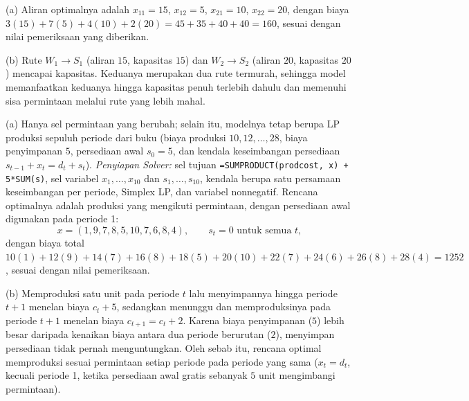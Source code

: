 (a) Aliran optimalnya adalah $x_{11} = 15$, $x_{12} = 5$, $x_{21} = 10$, $x_{22} = 20$, dengan biaya $3(15) + 7(5) + 4(10) + 2(20) = 45 + 35 + 40 + 40 = 160$, sesuai dengan nilai pemeriksaan yang diberikan.

(b) Rute $W_1 \to S_1$ (aliran $15$, kapasitas $15$) dan $W_2 \to S_2$ (aliran $20$, kapasitas $20$) mencapai kapasitas. Keduanya merupakan dua rute termurah, sehingga model memanfaatkan keduanya hingga kapasitas penuh terlebih dahulu dan memenuhi sisa permintaan melalui rute yang lebih mahal.


(a) Hanya sel permintaan yang berubah; selain itu, modelnya tetap berupa LP produksi sepuluh periode dari buku (biaya produksi $10, 12, \dots, 28$, biaya penyimpanan $5$, persediaan awal $s_0 = 5$, dan kendala keseimbangan persediaan $s_{t-1} + x_t = d_t + s_t$). \emph{Penyiapan Solver:} sel tujuan \texttt{=SUMPRODUCT(prodcost, x) + 5*SUM(s)}, sel variabel $x_1,\dots,x_{10}$ dan $s_1,\dots,s_{10}$, kendala berupa satu persamaan keseimbangan per periode, Simplex LP, dan variabel nonnegatif. Rencana optimalnya adalah produksi yang mengikuti permintaan, dengan persediaan awal digunakan pada periode 1:
\[
x = (1, 9, 7, 8, 5, 10, 7, 6, 8, 4), \qquad s_t = 0 \text{ untuk semua } t,
\]
dengan biaya total $10(1) + 12(9) + 14(7) + 16(8) + 18(5) + 20(10) + 22(7) + 24(6) + 26(8) + 28(4) = 1252$, sesuai dengan nilai pemeriksaan.

(b) Memproduksi satu unit pada periode $t$ lalu menyimpannya hingga periode $t+1$ menelan biaya $c_t + 5$, sedangkan menunggu dan memproduksinya pada periode $t+1$ menelan biaya $c_{t+1} = c_t + 2$. Karena biaya penyimpanan ($5$) lebih besar daripada kenaikan biaya antara dua periode berurutan ($2$), menyimpan persediaan tidak pernah menguntungkan. Oleh sebab itu, rencana optimal memproduksi sesuai permintaan setiap periode pada periode yang sama ($x_t = d_t$, kecuali periode 1, ketika persediaan awal gratis sebanyak $5$ unit mengimbangi permintaan).


